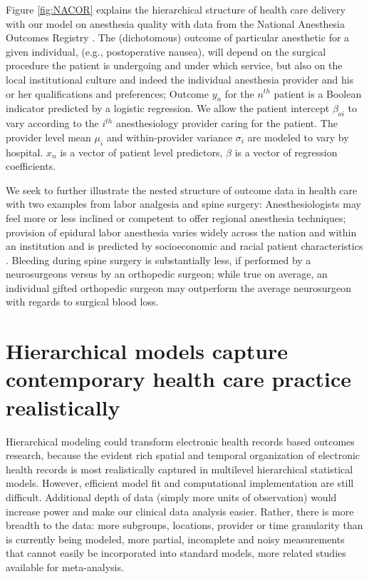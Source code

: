 \documentclass[11pt,notitlepage]{article}
\begin{document}
Figure \ref{fig:NACOR} explains the hierarchical structure of health care delivery with our model on anesthesia quality with data from the National Anesthesia Outcomes Registry . The (dichotomous) outcome of particular anesthetic for a given individual, (e.g., postoperative nausea), will depend on the surgical procedure the patient is undergoing and under which service, but also on the local institutional culture and indeed the individual anesthesia provider and his or her qualifications and preferences\cite{AndreaeWhite2015}; Outcome $y_n$ for the $n^{th}$ patient is a Boolean indicator predicted by a logistic regression. We allow the patient intercept $\beta_{oi}$ to vary according to the $i^{th}$ anesthesiology provider caring for the patient. The provider level mean $\mu_i$ and within-provider variance $\sigma_i$ are modeled to vary by hospital. $x_n$ is a vector of patient level predictors, $\beta$ is a vector of regression coefficients.  

We seek to further illustrate the nested structure of outcome data in health care with two examples from labor analgesia and spine surgery: Anesthesiologists may feel more or less inclined or competent to offer regional anesthesia techniques; provision of epidural labor anesthesia varies widely across the nation and within an institution and is predicted by socioeconomic and racial patient characteristics \cite{Rust2004,Glance2007}. Bleeding during spine surgery is substantially less, if performed by a neurosurgeons versus by an orthopedic surgeon; while true on average, an individual gifted orthopedic surgeon may outperform the average neurosurgeon with regards to surgical blood loss.

\section*{Hierarchical models capture contemporary health care practice realistically}
Hierarchical modeling could transform electronic health records based outcomes research, because the evident rich spatial and temporal organization of electronic health records is most realistically captured in multilevel hierarchical statistical models. However, efficient model fit and computational implementation are still difficult.  Additional depth of data (simply more units of observation) would increase power and make our clinical data analysis easier. Rather, there is more breadth to the data: more subgroups, locations, provider or time granularity than is currently being modeled, more partial, incomplete and noisy measurements that cannot easily be incorporated into standard models, more related studies available for meta-analysis\cite{Andreae2015,Andreae2012}.
\end{document}
